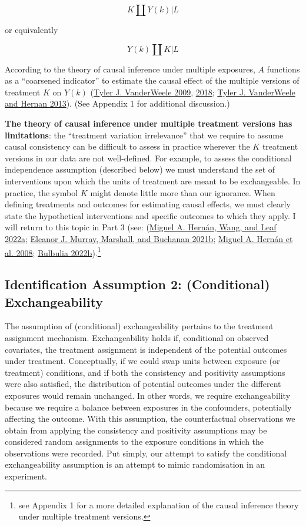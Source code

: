 \documentclass[
  singlecolumn]{report}
\begin{document}
\[
K \coprod Y(k) | L
\]

or equivalently

\[
Y(k) \coprod K | L
\]

According to the theory of causal inference under multiple exposures,
\(A\) functions as a ``coarsened indicator'' to estimate the causal
effect of the multiple versions of treatment \(K\) on \(Y(k)\)
(\protect\hyperlink{ref-vanderweele2009}{Tyler J. VanderWeele 2009},
\protect\hyperlink{ref-vanderweele2018}{2018};
\protect\hyperlink{ref-vanderweele2013}{Tyler J. VanderWeele and Hernan
2013}). (See Appendix 1 for additional discussion.)

\textbf{The theory of causal inference under multiple treatment versions
has limitations}: the ``treatment variation irrelevance'' that we
require to assume causal consistency can be difficult to assess in
practice wherever the \(K\) treatment versions in our data are not
well-defined. For example, to assess the conditional independence
assumption (described below) we must understand the set of interventions
upon which the units of treatment are meant to be exchangeable. In
practice, the symbol \(K\) m️ight denote little more than our ignorance.
When defining treatments and outcomes for estimating causal effects, we
must clearly state the hypothetical interventions and specific outcomes
to which they apply. I will return to this topic in Part 3 (see:
(\protect\hyperlink{ref-hernuxe1n2022a}{Miguel A. Hernán, Wang, and Leaf
2022a}; \protect\hyperlink{ref-murray2021a}{Eleanor J. Murray, Marshall,
and Buchanan 2021b}; \protect\hyperlink{ref-hernuxe1n2008}{Miguel A.
Hernán et al. 2008}; \protect\hyperlink{ref-bulbulia2022a}{Bulbulia
2022b}).\footnote{see Appendix 1 for a more detailed explanation of the
  causal inference theory under multiple treatment versions.}

\hypertarget{identification-assumption-2-conditional-exchangeability}{%
\subsection{Identification Assumption 2: (Conditional)
Exchangeability}\label{identification-assumption-2-conditional-exchangeability}}

The assumption of (conditional) exchangeability pertains to the
treatment assignment mechanism. Exchangeability holds if, conditional on
observed covariates, the treatment assignment is independent of the
potential outcomes under treatment. Conceptually, if we could swap units
between exposure (or treatment) conditions, and if both the consistency
and positivity assumptions were also satisfied, the distribution of
potential outcomes under the different exposures would remain unchanged.
In other words, we require exchangeability because we require a balance
between exposures in the confounders, potentially affecting the outcome.
With this assumption, the counterfactual observations we obtain from
applying the consistency and positivity assumptions may be considered
random assignments to the exposure conditions in which the observations
were recorded. Put simply, our attempt to satisfy the conditional
exchangeability assumption is an attempt to mimic randomisation in an
experiment.
\end{document}
